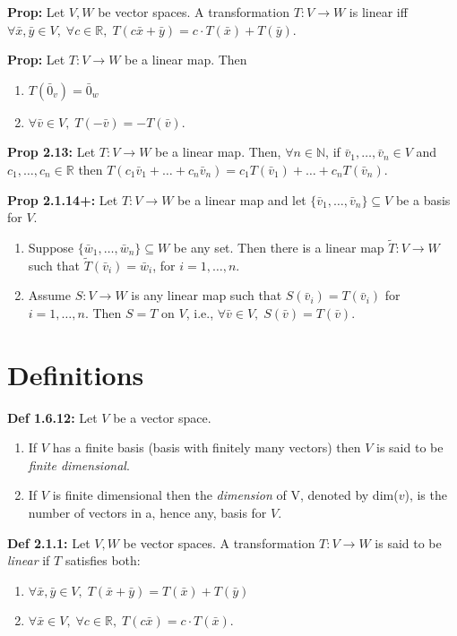 \textbf{Prop:} Let $V, W$ be vector spaces. A transformation $T: V \rightarrow W$ is linear iff $\forall \bar x, \bar y \in V, \; \forall c \in \mathbb{R}, \; T(c\bar x + \bar y) = c \cdot T(\bar x) + T(\bar y)$.

\bigskip 

\noindent 
\textbf{Prop:} Let $T:V \rightarrow W$ be a linear map. Then 
\begin{enumerate}
    \item $T(\bar 0_v) = \bar 0_w$
    \item $\forall \bar v \in V, \; T(-\bar v) = -T(\bar v)$.
\end{enumerate}

\bigskip 

\noindent 
\textbf{Prop 2.13:} Let $T : V \rightarrow W$ be a linear map. Then, $\forall n \in \mathbb{N}$, if $\bar v_1, \ldots , \bar v_n \in V$ and $c_1, \ldots , c_n \in \mathbb{R}$ then $T(c_1\bar v_1 + \ldots + c_n\bar v_n) = c_1 T(\bar v_1) + \ldots + c_n T (\bar v_n)$.

\pagebreak 

\noindent 
\textbf{Prop 2.1.14+:} Let $T : V \rightarrow W$ be a linear map and let $\{\bar v_1, \ldots , \bar v_n\} \subseteq V$ be a basis for $V$. 
\begin{enumerate}
    \item Suppose $\{\bar w_1, \ldots , \bar w_n\} \subseteq W$ be any set. Then there is a linear map $\widetilde{T} : V \rightarrow W$ such that $\widetilde{T} (\bar v_i) = \bar w_i$, for $i = 1, \ldots , n$.
    \item Assume $S : V \rightarrow W$ is any linear map such that $S(\bar v_i) = T(\bar v_i)$ for $i = 1, \ldots , n$. Then $S = T$ on $V$, i.e., $\forall \bar v \in V, \; S(\bar v) = T(\bar v)$.
\end{enumerate}

\section*{Definitions}

\textbf{Def 1.6.12:} Let $V$ be a vector space.
\begin{enumerate}
    \item If $V$ has a finite basis (basis with finitely many vectors) then $V$ is said to be \textit{finite dimensional}. 
    \item If $V$ is finite dimensional then the \textit{dimension} of V, denoted by dim($v$), is the number of vectors in a, hence any, basis for $V$. 
\end{enumerate}

\bigskip 

\noindent 
\textbf{Def 2.1.1:} Let $V, W$ be vector spaces. A transformation $T:V\rightarrow W$ is said to be \textit{linear} if $T$ satisfies both:
\begin{enumerate}
    \item $\forall \bar x, \bar y \in V, \; T(\bar x + \bar y) = T(\bar x) + T(\bar y)$
    \item $\forall \bar x \in V, \; \forall c \in \mathbb{R}, \; T(c\bar x) = c \cdot T(\bar x)$.
\end{enumerate}

